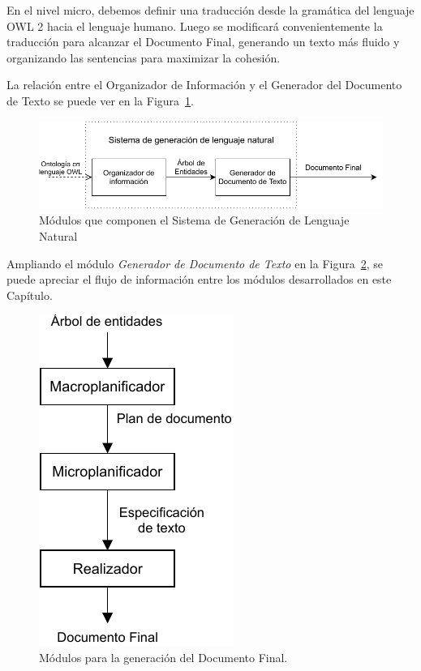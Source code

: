 En el nivel micro, debemos definir una traducción desde la gramática del lenguaje OWL 2 hacia el lenguaje humano. Luego se modificará convenientemente la traducción para alcanzar el Documento Final, generando un texto más fluido y organizando las sentencias para maximizar la cohesión.

La relación entre el Organizador de Información y el Generador del Documento de Texto se puede ver en la Figura~\ref{fig:modulos_sgln}.

\begin{figure}
    \centering
    \includegraphics{img/presentacion_problema/modulos_sgln.pdf}
    \caption{Módulos que componen el Sistema de Generación de Lenguaje Natural}
    \label{fig:modulos_sgln}
\end{figure}


Ampliando el módulo \emph{Generador de Documento de Texto} en la Figura~\ref{fig:modulos_documento_final}, se puede apreciar el flujo de información entre los módulos desarrollados en este Capítulo.

\begin{figure}
    \centering
    \includegraphics{img/generacion_documento/modulos_documento_final.pdf}
    \caption{Módulos para la generación del Documento Final.}
    \label{fig:modulos_documento_final}
\end{figure}


